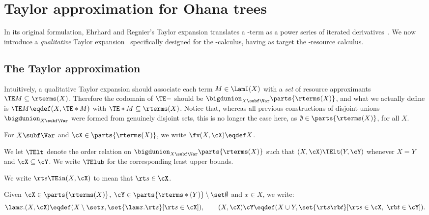 
\section{Taylor approximation for Ohana trees}\label{sec:TE4MTs}

In its original formulation, Ehrhard and Regnier's Taylor expansion translates a \lam-term as a power series of iterated derivatives~\cite{Ehrhard.Reg.06}.
We now introduce a \emph{qualitative} Taylor expansion~\cite{ManzonettoP11} specifically designed for the \lamI-calculus, having as target the \lamI-resource calculus.

\subsection{The Taylor approximation}

Intuitively, a qualitative Taylor expansion should associate each term $M \in \LamI(X)$ with a \emph{set} of resource approximants $\TE M \subseteq \rterms(X)$.
Therefore the codomain of $\TE -$ should be $\bigdunion_{X \subf \Var} \parts{\rterms(X)}$, and what we actually define is $\TE M \eqdef (X, \TE* M)$ with $\TE* M \subseteq \rterms(X)$.
Notice that, whereas all previous constructions of disjoint unions
$\bigdunion_{X \subf \Var}$ were formed from genuinely disjoint sets,
this is no longer the case here, as $\emptyset \in \parts{\rterms(X)}$, for all $X$.
\begin{notation}\mbox{}
\bsub
\item For $X \subf \Var$ and $\cX \in \parts{\rterms(X)}$,
	we write $\fv(X,\cX) \eqdef X$.
\item We let $\mathord{\TElt}$ denote the order relation
	on $\bigdunion_{X \subf \Var} \parts{\rterms(X)}$
	such that $(X,\cX) \TElt (Y,\cY)$
	whenever $X = Y$ and $\cX \subseteq \cY$.
	We write $\TElub$ for the corresponding least upper bounds.
\item We write $\rt s \TEin (X,\cX)$ to mean that $\rt s \in \cX$.
\item Given $\cX \in \parts{\rterms(X)}$, 
	$\cY \in \parts{\rterms*(Y)} \setminus \set\emptyset $
	and $x \in X$, we write:
	\[	\lam x.(X,\cX) \eqdef (X \setminus \set x, \set{\lam x.\rt s}[\rt s\in\cX]), \qquad
		(X,\cX) \cY \eqdef (X \cup Y, \set{\rt s\rb t}[\rt s \in \cX,\ \rb t \in \cY]). 
	\]
\esub
\end{notation}

